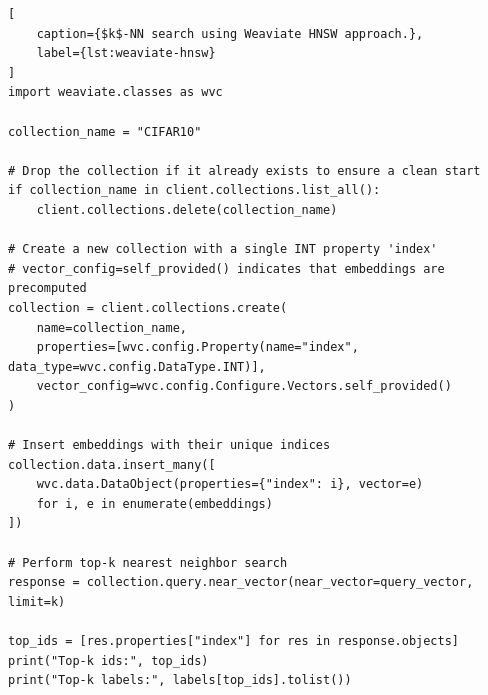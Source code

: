 \begin{lstlisting}[
    caption={$k$-NN search using Weaviate HNSW approach.},
    label={lst:weaviate-hnsw}
]
import weaviate.classes as wvc

collection_name = "CIFAR10"

# Drop the collection if it already exists to ensure a clean start
if collection_name in client.collections.list_all():
    client.collections.delete(collection_name)

# Create a new collection with a single INT property 'index'
# vector_config=self_provided() indicates that embeddings are precomputed
collection = client.collections.create(
    name=collection_name,
    properties=[wvc.config.Property(name="index", data_type=wvc.config.DataType.INT)],
    vector_config=wvc.config.Configure.Vectors.self_provided()
)

# Insert embeddings with their unique indices
collection.data.insert_many([
    wvc.data.DataObject(properties={"index": i}, vector=e)
    for i, e in enumerate(embeddings)
])

# Perform top-k nearest neighbor search
response = collection.query.near_vector(near_vector=query_vector, limit=k)

top_ids = [res.properties["index"] for res in response.objects]
print("Top-k ids:", top_ids)
print("Top-k labels:", labels[top_ids].tolist())
\end{lstlisting}